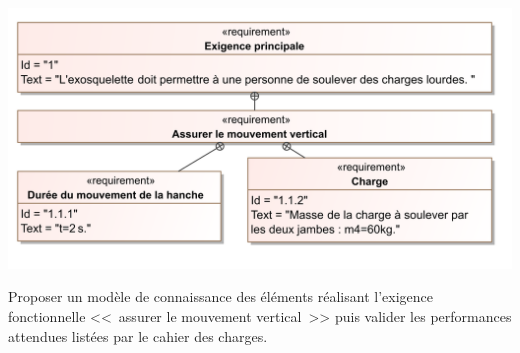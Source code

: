 \begin{multicols}{2}
\begin{tabular}{m{.6\linewidth}m{.3\linewidth}}
\end{tabular}



\begin{center}
\includegraphics[width=\linewidth]{images/Exigences}
\end{center}
\fi

\fi
\begin{obj}
Proposer un modèle de connaissance des éléments réalisant l’exigence fonctionnelle <<~assurer le mouvement vertical~>> puis valider les performances attendues listées par le cahier des charges.
\end{obj}




\end{multicols}
